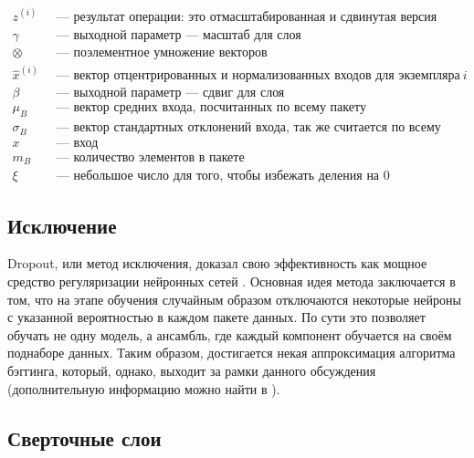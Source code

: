 \begin{align*}
	z^{(i)}      & \: \text{ --- результат операции: это отмасштабированная и сдвинутая версия входов}  \\
	\gamma       & \: \text{ --- выходной параметр --- масштаб для слоя}                                \\
	\otimes      & \: \text{ --- поэлементное умножение векторов}                                       \\
	\hat x^{(i)} & \: \text{ --- вектор отцентрированных и нормализованных входов для экземпляра} \: i  \\
	\beta        & \: \text{ --- выходной параметр --- сдвиг для слоя}                                  \\
	\mu_B        & \: \text{ --- вектор средних входа, посчитанных по всему пакету}                     \\
	\sigma_B     & \: \text{ --- вектор стандартных отклонений входа, так же считается по всему пакету} \\
	x            & \: \text{ --- вход}                                                                  \\
	m_B          & \: \text{ --- количество элементов в пакете}                                         \\
	\xi          & \: \text{ --- небольшое число для того, чтобы избежать деления на 0}
\end{align*}

\subsection{Исключение}

Dropout, или метод исключения, доказал свою эффективность как мощное средство
регуляризации нейронных сетей \cite{dropout-is-good}. Основная идея метода
заключается в том, что на этапе обучения случайным образом отключаются
некоторые нейроны с указанной вероятностью в каждом пакете данных. По сути это
позволяет обучать не одну модель, а ансамбль, где каждый компонент обучается на
своём поднаборе данных. Таким образом, достигается некая аппроксимация
алгоритма бэггинга, который, однако, выходит за рамки данного обсуждения
(дополнительную информацию можно найти в \cite{goodfellow}).

\subsection{Сверточные слои}

